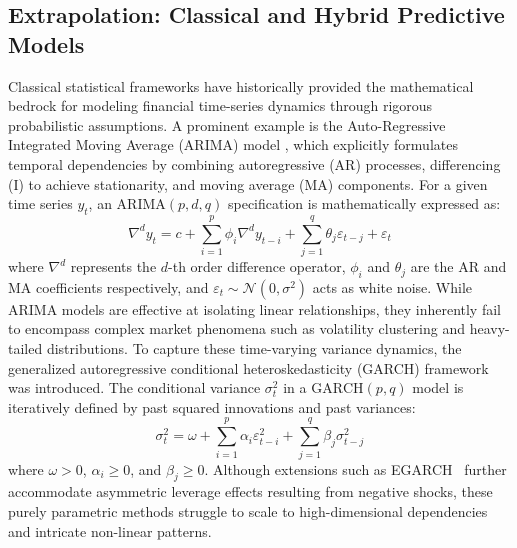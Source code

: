 \subsection{Extrapolation: Classical and Hybrid Predictive Models}

Classical statistical frameworks have historically provided the mathematical bedrock for modeling financial time-series dynamics through rigorous probabilistic assumptions. A prominent example is the Auto-Regressive Integrated Moving Average (ARIMA) model \citep{box2015time}, which explicitly formulates temporal dependencies by combining autoregressive (AR) processes, differencing (I) to achieve stationarity, and moving average (MA) components. For a given time series $y_t$, an $\text{ARIMA}(p, d, q)$ specification is mathematically expressed as:
\begin{equation}
\nabla^d y_t = c + \sum_{i=1}^p \phi_i \nabla^d y_{t-i} + \sum_{j=1}^q \theta_j \varepsilon_{t-j} + \varepsilon_t
\end{equation}
where $\nabla^d$ represents the $d$-th order difference operator, $\phi_i$ and $\theta_j$ are the AR and MA coefficients respectively, and $\varepsilon_t \sim \mathcal{N}(0, \sigma^2)$ acts as white noise. While ARIMA models are effective at isolating linear relationships, they inherently fail to encompass complex market phenomena such as volatility clustering and heavy-tailed distributions. To capture these time-varying variance dynamics, the generalized autoregressive conditional heteroskedasticity (GARCH) framework~\citep{bollerslev1986garch} was introduced. The conditional variance $\sigma_t^2$ in a $\text{GARCH}(p, q)$ model is iteratively defined by past squared innovations and past variances:
\begin{equation}
\sigma_t^2 = \omega + \sum_{i=1}^p \alpha_i \varepsilon_{t-i}^2 + \sum_{j=1}^q \beta_j \sigma_{t-j}^2
\end{equation}
where $\omega > 0$, $\alpha_i \ge 0$, and $\beta_j \ge 0$. Although extensions such as EGARCH~\citep{nelson1991egarch} further accommodate asymmetric leverage effects resulting from negative shocks, these purely parametric methods struggle to scale to high-dimensional dependencies and intricate non-linear patterns.

